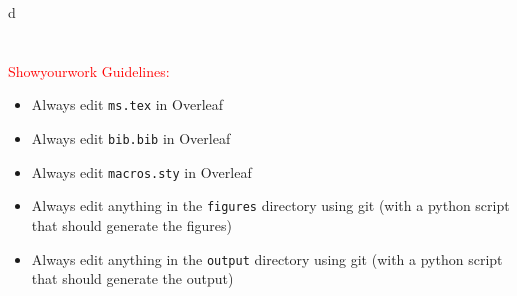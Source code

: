 \documentclass[]{aastex631}
\begin{document}
\begin{abstract}
\Acp{GW} from merging compact objects are the only transient sources that encode direct information about their luminosity distances. 
Paired with their redshifts, a Hubble diagram can be constructed to probe the Universe's expansion.  
``Spectral sirens'' use features in the mass distribution of \ac{GW} sources to extract this redshift information without the need for accompanying electromagnetic observations.
So far, this technique has only been applied with simple parametric representations of the mass distribution. 
However, the use of an incorrect mass model inevitably leads to biases in the cosmological inference, an acute problem given our current lack of understanding of the true source population.
Furthermore, it is commonly presumed that the exact shape of the mass distribution must be known \emph{a priori} to obtain unbiased measurements of cosmological parameters with the spectral siren methodology.
We demonstrate that prior knowledge of the \ac{GW} source mass distribution is not necessary in order to accurately infer cosmological parameters with spectral sirens.
We do this by constructing a flexible, Gaussian process-based model for the \ac{GW} source population to analyze simulated \ac{GW} data consistent with expectations for the next \acl{LVK} observing run.
We find that both the source mass model and cosmological parameters are correctly reconstructed, and predict a $\variable{output/nonparh0percent.txt}\%$ measurement of \Ho{} and a $\variable{output/Hz_percent.txt}\%$  measurement of $H(z=\variable{output/mostsensitivez.txt})$ ($1\sigma$ uncertainties).
This astrophysics-agnostic spectral siren technique will be key to deliver precise and unbiased cosmological constraints with future observations and in the presence of redshift evolution of the mass spectrum.  
\end{abstract}

d\section{}
\textcolor{red}{Showyourwork Guidelines:}
\begin{itemize}
    \item Always edit \texttt{ms.tex} in Overleaf
    \item Always edit \texttt{bib.bib} in Overleaf
    \item Always edit \texttt{macros.sty} in Overleaf
    \item Always edit anything in the \texttt{figures} directory using git (with a python script that should generate the figures)
    \item Always edit anything in the \texttt{output} directory using git (with a python script that should generate the output)
\end{itemize}
\end{document}
